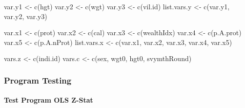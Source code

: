 \documentclass[
]{book}
\newenvironment{Shaded}{\begin{snugshade}}{\end{snugshade}}
\newcommand{\FunctionTok}[1]{\textcolor[rgb]{0.00,0.00,0.00}{#1}}
\newcommand{\NormalTok}[1]{#1}
\newcommand{\OtherTok}[1]{\textcolor[rgb]{0.56,0.35,0.01}{#1}}
\newcommand{\StringTok}[1]{\textcolor[rgb]{0.31,0.60,0.02}{#1}}
\begin{document}
\begin{Shaded}
\begin{Highlighting}[]
\NormalTok{var.y1 }\OtherTok{\textless{}{-}} \FunctionTok{c}\NormalTok{(}\StringTok{\textquotesingle{}hgt\textquotesingle{}}\NormalTok{)}
\NormalTok{var.y2 }\OtherTok{\textless{}{-}} \FunctionTok{c}\NormalTok{(}\StringTok{\textquotesingle{}wgt\textquotesingle{}}\NormalTok{)}
\NormalTok{var.y3 }\OtherTok{\textless{}{-}} \FunctionTok{c}\NormalTok{(}\StringTok{\textquotesingle{}vil.id\textquotesingle{}}\NormalTok{)}
\NormalTok{list.vars.y }\OtherTok{\textless{}{-}} \FunctionTok{c}\NormalTok{(var.y1, var.y2, var.y3)}

\NormalTok{var.x1 }\OtherTok{\textless{}{-}} \FunctionTok{c}\NormalTok{(}\StringTok{\textquotesingle{}prot\textquotesingle{}}\NormalTok{)}
\NormalTok{var.x2 }\OtherTok{\textless{}{-}} \FunctionTok{c}\NormalTok{(}\StringTok{\textquotesingle{}cal\textquotesingle{}}\NormalTok{)}
\NormalTok{var.x3 }\OtherTok{\textless{}{-}} \FunctionTok{c}\NormalTok{(}\StringTok{\textquotesingle{}wealthIdx\textquotesingle{}}\NormalTok{)}
\NormalTok{var.x4 }\OtherTok{\textless{}{-}} \FunctionTok{c}\NormalTok{(}\StringTok{\textquotesingle{}p.A.prot\textquotesingle{}}\NormalTok{)}
\NormalTok{var.x5 }\OtherTok{\textless{}{-}} \FunctionTok{c}\NormalTok{(}\StringTok{\textquotesingle{}p.A.nProt\textquotesingle{}}\NormalTok{)}
\NormalTok{list.vars.x }\OtherTok{\textless{}{-}} \FunctionTok{c}\NormalTok{(var.x1, var.x2, var.x3, var.x4, var.x5)}

\NormalTok{vars.z }\OtherTok{\textless{}{-}} \FunctionTok{c}\NormalTok{(}\StringTok{\textquotesingle{}indi.id\textquotesingle{}}\NormalTok{)}
\NormalTok{vars.c }\OtherTok{\textless{}{-}} \FunctionTok{c}\NormalTok{(}\StringTok{\textquotesingle{}sex\textquotesingle{}}\NormalTok{, }\StringTok{\textquotesingle{}wgt0\textquotesingle{}}\NormalTok{, }\StringTok{\textquotesingle{}hgt0\textquotesingle{}}\NormalTok{, }\StringTok{\textquotesingle{}svymthRound\textquotesingle{}}\NormalTok{)}
\end{Highlighting}
\end{Shaded}

\hypertarget{program-testing-1}{%
\subsubsection{Program Testing}\label{program-testing-1}}

\hypertarget{test-program-ols-z-stat}{%
\paragraph{Test Program OLS Z-Stat}\label{test-program-ols-z-stat}}
\end{document}
